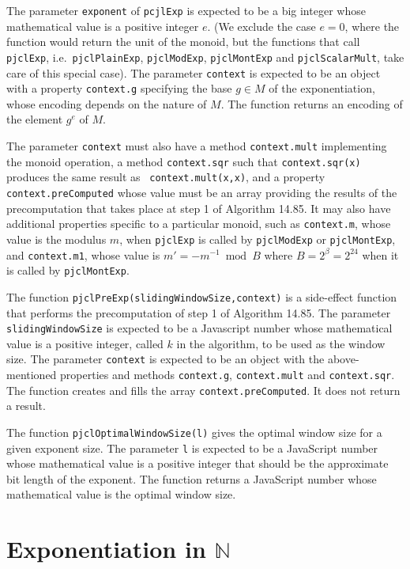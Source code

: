 \documentclass[12pt]{article}
\begin{document}
The parameter {\tt exponent} of {\tt pcjlExp} is expected to be a big
integer whose mathematical value is a positive integer $e$.  (We
exclude the case $e=0$, where the function would return the unit of
the monoid, but the functions that call {\tt pjclExp}, i.e.\ {\tt pjclPlainExp}, {\tt pjclModExp}, {\tt pjclMontExp} and {\tt pjclScalarMult}, take care of this special case).  The parameter {\tt context}
is expected to be an object with a property {\tt context.g} specifying
the base $g \in M$ of the exponentiation, whose encoding depends on
the nature of $M$.  The function returns an encoding of the element
$g^e$ of $M$.

The parameter {\tt context} must also have a method {\tt context.mult}
implementing the monoid operation, a method {\tt context.sqr} such
that {\tt context.sqr(x)} produces the same result as {\tt
  context.mult(x,x)}, and a property {\tt context.preComputed} whose
value must be an array providing the results of the precomputation that takes place
at step 1 of Algorithm 14.85.  It may also have additional properties
specific to a particular monoid, such as {\tt context.m}, whose value
is the modulus $m$, when {\tt pjclExp} is called by {\tt pjclModExp} or
{\tt pjclMontExp}, and {\tt context.m1}, whose value is $m' = -m^{-1}
\bmod B$ where $B=2^\beta=2^{24}$ when it is called by {\tt pjclMontExp}.

The function {\tt pjclPreExp(slidingWindowSize,context)} is a side-effect function 
that performs the
precomputation of step 1 of Algorithm 14.85.  The parameter {\tt
  slidingWindowSize} is expected to be a Javascript number whose
mathematical value is a positive integer, called $k$ in the algorithm,
to be used as the window size.  The parameter {\tt context} is
expected to be an object with the above-mentioned properties and
methods {\tt context.g}, {\tt context.mult} and {\tt context.sqr}.
The function creates and fills the array {\tt context.preComputed}.
It does not return a result.

The function {\tt pjclOptimalWindowSize(l)} gives the optimal window
size for a given exponent size.  The parameter {\tt l} is expected to
be a JavaScript number whose mathematical value is a positive integer that should be the approximate
bit length of the exponent.  The function returns a JavaScript number
whose mathematical value is the optimal window size.

\section{Exponentiation in $\mathbb{N}$}
\end{document}
